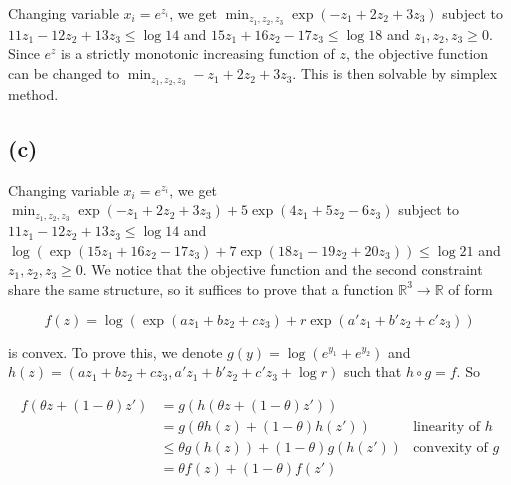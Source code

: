 \documentclass{article}
\begin{document}
Changing variable $x_i=e^{z_i}$, we get $\min_{z_1,z_2,z_3}\exp(-z_1+2z_2+3z_3)$ subject to $11z_1-12z_2+13z_3\le\log 14$ and $15z_1+16z_2-17z_3\le\log 18$ and $z_1,z_2,z_3\ge0$. Since $e^z$ is a strictly monotonic increasing function of $z$, the objective function can be changed to $\min_{z_1,z_2,z_3}-z_1+2z_2+3z_3$. This is then solvable by simplex method.

\subsection*{(c)}

Changing variable $x_i=e^{z_i}$, we get $\min_{z_1,z_2,z_3}\exp(-z_1+2z_2+3z_3)+5\exp(4z_1+5z_2-6z_3)$ subject to $11z_1-12z_2+13z_3\le\log 14$ and $\log(\exp(15z_1+16z_2-17z_3)+7\exp(18z_1-19z_2+20z_3))\le\log 21$ and $z_1,z_2,z_3\ge0$. We notice that the objective function and the second constraint share the same structure, so it suffices to prove that a function $\mathbb R^3\to\mathbb R$ of form

$$
f(z)=\log(\exp(az_1+bz_2+cz_3)+r\exp(a'z_1+b'z_2+c'z_3))
$$

is convex. To prove this, we denote $g(y)=\log(e^{y_1}+e^{y_2})$ and $h(z)=(az_1+bz_2+cz_3,a'z_1+b'z_2+c'z_3+\log r)$ such that $h\circ g=f$. So

$$
\begin{aligned}
    f(\theta z+(1-\theta)z')
    &=g(h(\theta z+(1-\theta)z'))\\
    &=g(\theta h(z)+(1-\theta)h(z'))&\text{linearity of $h$}\\
    &\le\theta g(h(z))+(1-\theta)g(h(z'))&\text{convexity of $g$}\\
    &=\theta f(z)+(1-\theta)f(z')
\end{aligned}
$$
\end{document}
